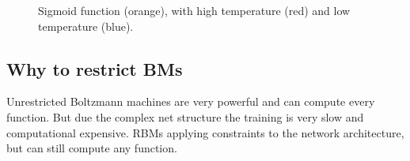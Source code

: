 \begin{figure}
\centering
{}
\caption{Sigmoid function (orange), with high temperature (red) and low temperature (blue).}
\label{fig:bm-simulated-annealing}
\end{figure}

\subsection{Why to restrict BMs}
Unrestricted Boltzmann machines are very powerful and can compute every
function. But due the complex net structure the training is very slow and
computational expensive. \Glspl{RBM} applying constraints to the network
architecture, but can still compute any function.


